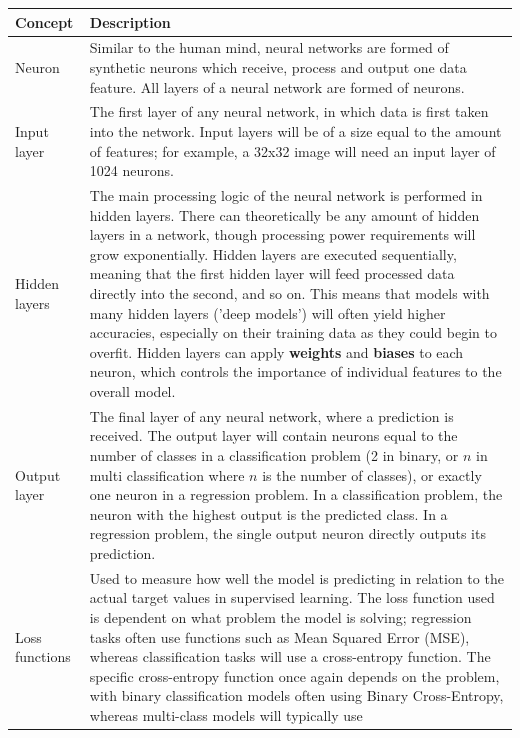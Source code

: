 \documentclass[12pt]{report}
\begin{document}
\begin{longtable}{ | p{} | p{} | }
    \hline
    \cellcolor{blue!25} Concept & \cellcolor{blue!25} Description \\
    \hline
    Neuron & Similar to the human mind, neural networks are formed of synthetic neurons which receive, process and output one 
    data feature. All layers of a neural network are formed of neurons. \\
    \hline 
    Input layer & The first layer of any neural network, in which data is first taken into the network. Input layers 
    will be of a size equal to the amount of features; for example, a 32x32 image will need an input layer of 1024 neurons. \\
    \hline
    Hidden layers & The main processing logic of the neural network is performed in hidden layers. There can theoretically be any 
    amount of hidden layers in a network, though processing power requirements will grow exponentially. Hidden layers are executed sequentially,
    meaning that the first hidden layer will feed processed data directly into the second, and so on. This means that models with many hidden 
    layers ('deep models') will often yield higher accuracies, especially on their training data as they could begin to overfit. 
    Hidden layers can apply \textbf{weights} and \textbf{biases} to each neuron, which controls the importance of individual features 
    to the overall model.  \\
    \hline 
    Output layer & The final layer of any neural network, where a prediction is received. The output layer will contain neurons equal 
    to the number of classes in a classification problem (2 in binary, or $n$ in multi classification where $n$ is the number of classes),
    or exactly one neuron in a regression problem. In a classification problem,
    the neuron with the highest output is the predicted class. In a regression problem, the single output neuron directly outputs its
    prediction. \\
    \hline 
    Loss functions & Used to measure how well the model is predicting in relation to the actual target values in supervised learning.
    The loss function used is dependent on what problem the model is solving; regression tasks often use functions such as Mean Squared 
    Error (MSE), whereas classification tasks will use a cross-entropy function. The specific cross-entropy function once again depends 
    on the problem, with binary classification models often using Binary Cross-Entropy, whereas multi-class models will typically use 

\end{longtable}
\end{document}
